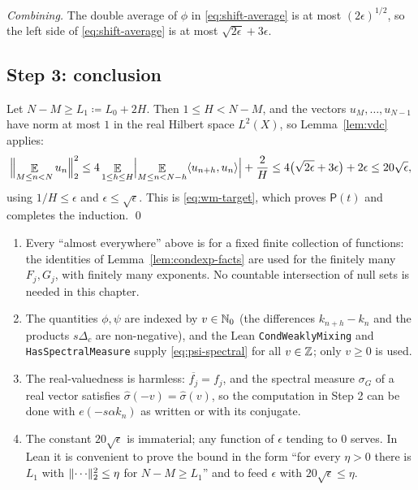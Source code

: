 \emph{Combining.}  The double average of $\phi$ in \eqref{eq:shift-average} is at most
$(2\epsilon)^{1/2}$, so the left side of \eqref{eq:shift-average} is at most
$\sqrt{2\epsilon} + 3\epsilon$.

\subsection*{Step 3: conclusion}

Let $N - M \geq L_1 \coloneqq L_0 + 2H$.  Then $1 \leq H < N - M$, and the vectors
$u_M,\dots,u_{N-1}$ have norm at most $1$ in the real Hilbert space $L^2(X)$, so
Lemma~\ref{lem:vdc} applies:
\[
  \Bigl\lVert \mathop{\mathbb{E}}_{M \leq n < N} u_n \Bigr\rVert_2^2
    \leq 4 \mathop{\mathbb{E}}_{1 \leq h \leq H} \Bigl\lvert \mathop{\mathbb{E}}_{M \leq n < N-h} \langle u_{n+h}, u_n \rangle \Bigr\rvert + \frac 2H
    \leq 4\bigl(\sqrt{2\epsilon} + 3\epsilon\bigr) + 2\epsilon \leq 20\sqrt\epsilon ,
\]
using $1/H \leq \epsilon$ and $\epsilon \leq \sqrt\epsilon$.  This is \eqref{eq:wm-target},
which proves $\mathsf P(t)$ and completes the induction.  \qed

\begin{remark}
  \begin{enumerate}
    \item Every ``almost everywhere'' above is for a fixed finite collection of functions:
      the identities of Lemma~\ref{lem:condexp-facts} are used for the finitely many
      $F_j, G_j$, with finitely many exponents.  No countable intersection of null sets is needed
      in this chapter.
    \item The quantities $\phi, \psi$ are indexed by $v \in \mathbb{N}_0$ (the differences
      $k_{n+h} - k_n$ and the products $s\Delta_c$ are non-negative), and the Lean
      \texttt{CondWeaklyMixing} and \texttt{HasSpectralMeasure} supply \eqref{eq:psi-spectral}
      for all $v \in \mathbb{Z}$; only $v \geq 0$ is used.
    \item The real-valuedness is harmless: $\overline{f_j} = f_j$, and the spectral measure
      $\sigma_G$ of a real vector satisfies $\widehat\sigma(-v) = \widehat\sigma(v)$, so the
      computation in Step 2 can be done with $e(-s\alpha k_n)$ as written or with its conjugate.
    \item The constant $20\sqrt{\epsilon}$ is immaterial; any function of $\epsilon$ tending to
      $0$ serves.  In Lean it is convenient to prove the bound in the form
      ``for every $\eta > 0$ there is $L_1$ with $\lVert \cdots \rVert_2^2 \leq \eta$ for
      $N - M \geq L_1$'' and to feed $\epsilon$ with $20\sqrt\epsilon \leq \eta$.
  \end{enumerate}
\end{remark}

